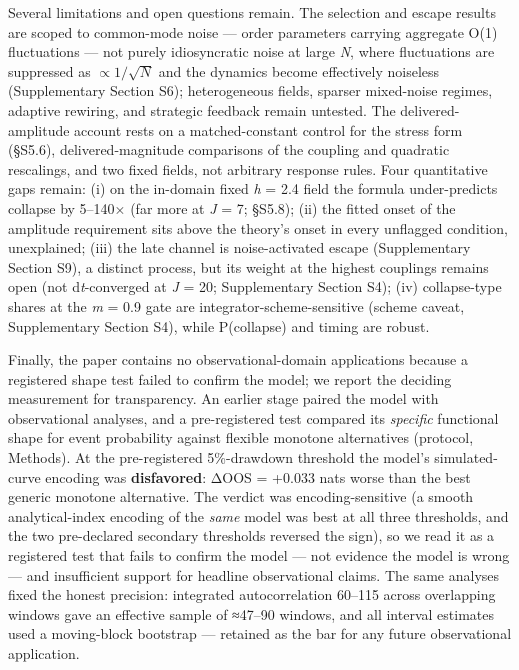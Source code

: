\documentclass[11pt,letterpaper]{article}
\begin{document}
Several limitations and open questions remain. The selection and escape results are scoped to common-mode noise --- order parameters carrying aggregate O(1) fluctuations --- not purely idiosyncratic noise at large \emph{N}, where fluctuations are suppressed as \(\propto 1/\sqrt{N}\) and the dynamics become effectively noiseless (Supplementary Section S6); heterogeneous fields, sparser mixed-noise regimes, adaptive rewiring, and strategic feedback remain untested. The delivered-amplitude account rests on a matched-constant control for the stress form (§S5.6), delivered-magnitude comparisons of the coupling and quadratic rescalings, and two fixed fields, not arbitrary response rules. Four quantitative gaps remain: (i) on the in-domain fixed \emph{h} = 2.4 field the formula under-predicts collapse by 5--140× (far more at \emph{J} = 7; §S5.8); (ii) the fitted onset of the amplitude requirement sits above the theory's onset in every unflagged condition, unexplained; (iii) the late channel is noise-activated escape (Supplementary Section S9), a distinct process, but its weight at the highest couplings remains open (not d\emph{t}-converged at \emph{J} = 20; Supplementary Section S4); (iv) collapse-type shares at the \textbar{}\emph{m}\textbar{} = 0.9 gate are integrator-scheme-sensitive (scheme caveat, Supplementary Section S4), while P(collapse) and timing are robust.

Finally, the paper contains no observational-domain applications because a registered shape test failed to confirm the model; we report the deciding measurement for transparency. An earlier stage paired the model with observational analyses, and a pre-registered test compared its \emph{specific} functional shape for event probability against flexible monotone alternatives (protocol, Methods). At the pre-registered 5\%-drawdown threshold the model's simulated-curve encoding was \textbf{disfavored}: ΔOOS = +0.033 nats worse than the best generic monotone alternative. The verdict was encoding-sensitive (a smooth analytical-index encoding of the \emph{same} model was best at all three thresholds, and the two pre-declared secondary thresholds reversed the sign), so we read it as a registered test that fails to confirm the model --- not evidence the model is wrong --- and insufficient support for headline observational claims. The same analyses fixed the honest precision: integrated autocorrelation 60--115 across overlapping windows gave an effective sample of ≈47--90 windows, and all interval estimates used a moving-block bootstrap --- retained as the bar for any future observational application.
\end{document}
